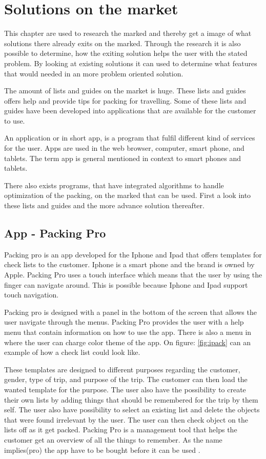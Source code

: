 \section{Solutions on the market}
\label{sec:Solution}
This chapter are used to research the marked and thereby get a image of what solutions there already exits on the marked. Through the research it is also possible to determine, how the exiting solution helps the user with the stated problem. By looking at existing solutions it can used to determine what features that would needed in an more problem oriented solution.

The amount of lists and guides on the market is huge. These lists and guides offers help and provide tips for packing for travelling. Some of these lists and guides have been developed into applications that are available for the customer to use.

An application or in short app, is a program that fulfil different kind of services for the user. Apps are used in the web browser, computer, smart phone, and tablets. The term app is general mentioned in context to smart phones and tablets.

There also exists programs, that have integrated algorithms to handle optimization of the packing, on the marked that can be used.
First a look into these lists and guides and the more advance solution thereafter.

\subsection*{App - Packing Pro}

Packing pro is an app developed for the Iphone and Ipad that offers templates for check lists to the customer. Iphone is a smart phone and the brand is owned by Apple. Packing Pro uses a touch interface which means that the user by using the finger can navigate around. This is possible because Iphone and Ipad support touch navigation.


Packing pro is designed with a panel in the bottom of the screen that allows the user navigate through the menus. Packing Pro provides the user with a help menu that contain information on how to use the app. There is also a menu in where the user can charge color theme of the app. On figure: \ref{fig:ipack} can an example of how a check list could look like.

These templates are designed to different purposes regarding the customer, gender, type of trip, and purpose of the trip.
The customer can then load the wanted template for the purpose. The user also have the possibility to create their own lists by adding things that should be remembered for the trip by them self. The user also have possibility to select an existing list and delete the objects that were found irrelevant by the user. The user can then check object on the lists off as it get packed. Packing Pro is a management tool that helps the customer get an overview of all the things to remember. As the name implies(pro) the app have to be bought before it can be used  \citep{packingpro}.

